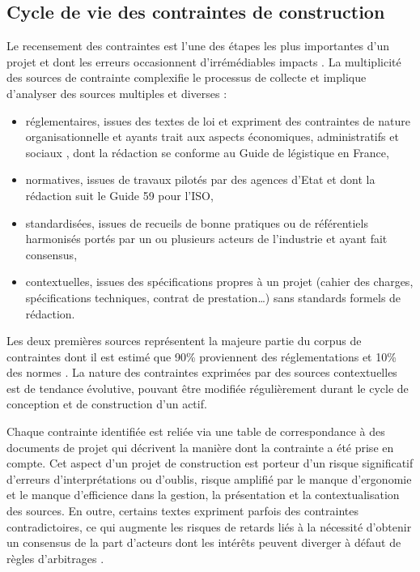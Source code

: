 \documentclass[a4paper,12pt]{article}
\begin{document}
\subsection{Cycle de vie des contraintes de construction}
\label{sec:org62ab785}
Le recensement des contraintes est l’une des étapes les plus importantes d’un projet et dont les erreurs occasionnent d’irrémédiables impacts \autocite{mabeloRequirementsManagementProject2025a}. La multiplicité des sources de contrainte complexifie le processus de collecte et implique d’analyser des sources multiples et diverses : 
\begin{itemize}
\item réglementaires, issues des textes de loi et expriment des contraintes de nature organisationnelle et ayants trait aux aspects économiques, administratifs et sociaux \autocite{devinazRapportDinformationFait2023}, dont la rédaction se conforme au Guide de légistique \autocite{GuideLegistique2017a} en France,
\item normatives, issues de travaux pilotés par des agences d’Etat et dont la rédaction suit le Guide 59 \autocite{PratiquesNormalisationRecommandees2019a} pour l’ISO,
\item standardisées, issues de recueils de bonne pratiques ou de référentiels harmonisés portés par un ou plusieurs acteurs de l’industrie et ayant fait consensus,
\item contextuelles, issues des spécifications propres à un projet (cahier des charges, spécifications techniques, contrat de prestation\ldots{}) sans standards formels de rédaction.
\end{itemize}

Les deux premières sources représentent la majeure partie du corpus de contraintes dont il est estimé que 90\% proviennent des réglementations et 10\% des normes \autocite{baudetTropNormesAFNOR2024}. La nature des contraintes exprimées par des sources contextuelles est de tendance évolutive, pouvant être modifiée régulièrement durant le cycle de conception et de construction d’un actif.

Chaque contrainte identifiée est reliée via une table de correspondance à des documents de projet qui décrivent la manière dont la contrainte a été prise en compte. Cet aspect d’un projet de construction est porteur d’un risque significatif d'erreurs d'interprétations ou d'oublis,  risque amplifié par le manque d'ergonomie et le manque d'efficience dans la gestion, la présentation et la contextualisation des sources. En outre, certains textes expriment parfois des contraintes contradictoires, ce qui augmente les risques de retards liés à la nécessité d’obtenir un consensus de la part d’acteurs dont les intérêts peuvent diverger  à défaut de règles d’arbitrages \autocite{EntryForceEuropean2024a,robertorodriguezCoherenceOuContradiction2022}.
\end{document}
